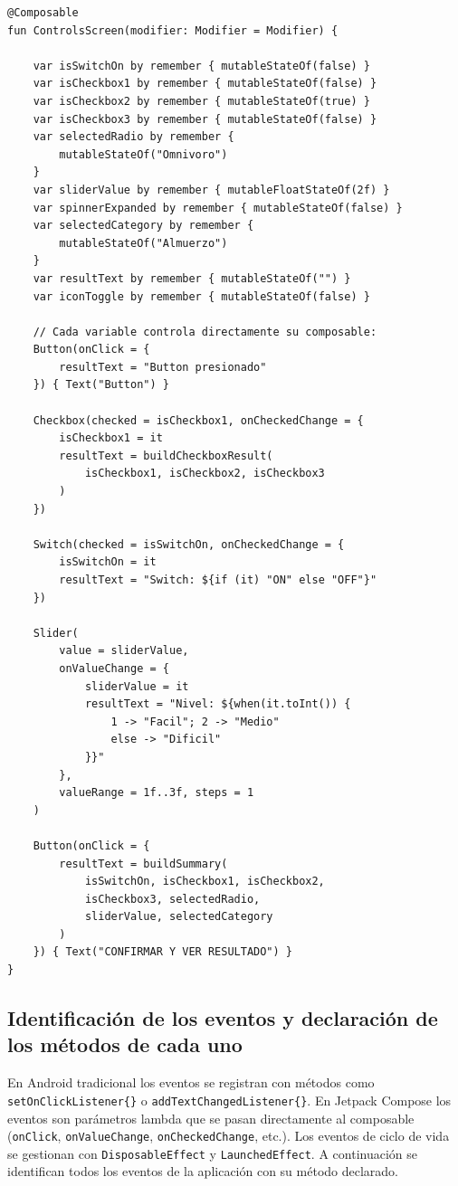 \documentclass[stu, 12pt, letterpaper, donotrepeattitle, floatsintext, natbib]{apa7}
\begin{document}
\begin{lstlisting}[caption={Variables y vínculos en ControlsScreen.kt}]
@Composable
fun ControlsScreen(modifier: Modifier = Modifier) {

    var isSwitchOn by remember { mutableStateOf(false) }
    var isCheckbox1 by remember { mutableStateOf(false) }
    var isCheckbox2 by remember { mutableStateOf(true) }
    var isCheckbox3 by remember { mutableStateOf(false) }
    var selectedRadio by remember {
        mutableStateOf("Omnivoro")
    }
    var sliderValue by remember { mutableFloatStateOf(2f) }
    var spinnerExpanded by remember { mutableStateOf(false) }
    var selectedCategory by remember {
        mutableStateOf("Almuerzo")
    }
    var resultText by remember { mutableStateOf("") }
    var iconToggle by remember { mutableStateOf(false) }

    // Cada variable controla directamente su composable:
    Button(onClick = {
        resultText = "Button presionado"
    }) { Text("Button") }

    Checkbox(checked = isCheckbox1, onCheckedChange = {
        isCheckbox1 = it
        resultText = buildCheckboxResult(
            isCheckbox1, isCheckbox2, isCheckbox3
        )
    })

    Switch(checked = isSwitchOn, onCheckedChange = {
        isSwitchOn = it
        resultText = "Switch: ${if (it) "ON" else "OFF"}"
    })

    Slider(
        value = sliderValue,
        onValueChange = {
            sliderValue = it
            resultText = "Nivel: ${when(it.toInt()) {
                1 -> "Facil"; 2 -> "Medio"
                else -> "Dificil"
            }}"
        },
        valueRange = 1f..3f, steps = 1
    )

    Button(onClick = {
        resultText = buildSummary(
            isSwitchOn, isCheckbox1, isCheckbox2,
            isCheckbox3, selectedRadio,
            sliderValue, selectedCategory
        )
    }) { Text("CONFIRMAR Y VER RESULTADO") }
}
\end{lstlisting}

\subsection{Identificación de los eventos y declaración de los métodos de cada uno}
\label{sec:eventos}

En Android tradicional los eventos se registran con métodos como
\texttt{setOnClickListener\{\}} o \texttt{addTextChangedListener\{\}}. En Jetpack Compose
los eventos son parámetros lambda que se pasan directamente al composable
(\texttt{onClick}, \texttt{onValueChange}, \texttt{onCheckedChange}, etc.). Los eventos
de ciclo de vida se gestionan con \texttt{DisposableEffect} y \texttt{LaunchedEffect}.
A continuación se identifican todos los eventos de la aplicación con su método declarado.
\end{document}
